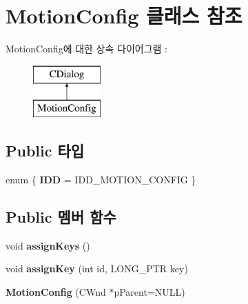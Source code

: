 \hypertarget{class_motion_config}{}\section{Motion\+Config 클래스 참조}
\label{class_motion_config}
Motion\+Config에 대한 상속 다이어그램 \+: \begin{figure}[H]
\begin{center}
\leavevmode
\includegraphics[height=2.000000cm]{class_motion_config}
\end{center}
\end{figure}
\subsection*{Public 타입}
\begin{DoxyCompactItemize}
\item 
\mbox{\label{class_motion_config_a8d6ecd105518fc0b880fdd120583c743}} 
enum \{ {\bfseries I\+DD} = I\+D\+D\+\_\+\+M\+O\+T\+I\+O\+N\+\_\+\+C\+O\+N\+F\+IG
 \}
\end{DoxyCompactItemize}
\subsection*{Public 멤버 함수}
\begin{DoxyCompactItemize}
\item 
\mbox{\label{class_motion_config_a73d6bc239e8abd59b68f23ddaaf6daf4}} 
void {\bfseries assign\+Keys} ()
\item 
\mbox{\label{class_motion_config_a50d94176c92cf39ca894892a0b3bf2ef}} 
void {\bfseries assign\+Key} (int id, L\+O\+N\+G\+\_\+\+P\+TR key)
\item 
\mbox{\label{class_motion_config_a005e9fbe2d6a2d783a48e1bc3b6aa27e}} 
{\bfseries Motion\+Config} (C\+Wnd $\ast$p\+Parent=N\+U\+LL)
\end{DoxyCompactItemize}
